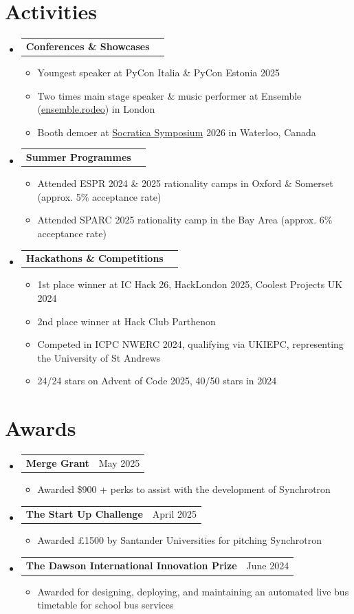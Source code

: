 \documentclass[letterpaper,11pt]{article}
\makeatletter
\newcommand{\resumeItem}[1]{
  \item\small{
    {#1 \vspace{-2pt}}
  }
}
\newcommand{\resumeProjectHeading}[2]{
    \item
    \begin{tabular*}{0.97\textwidth}{l@{\extracolsep{\fill}}r}
      \textbf{#1} & #2 \\
    \end{tabular*}\vspace{-7pt}
}
\newcommand{\resumeSubHeadingListStart}{\begin{itemize}[leftmargin=0.15in, label={}]}
\newcommand{\resumeSubHeadingListEnd}{\end{itemize}}
\newcommand{\resumeItemListStart}{\begin{itemize}}
\newcommand{\resumeItemListEnd}{\end{itemize}\vspace{-5pt}}
\makeatother
\begin{document}
\section{Activities}
    \resumeSubHeadingListStart
      \resumeProjectHeading
        {Conferences \& Showcases}{}
        \resumeItemListStart
          \resumeItem{Youngest speaker at PyCon Italia \& PyCon Estonia 2025}
          \resumeItem{Two times main stage speaker \& music performer at Ensemble (\href{https://ensemble.rodeo}{ensemble.rodeo}) in London}
          \resumeItem{Booth demoer at \href{https://symposium.socratica.info/}{Socratica Symposium} 2026 in Waterloo, Canada}
        \resumeItemListEnd
      \resumeProjectHeading
        {Summer Programmes}{}
        \resumeItemListStart
          \resumeItem{Attended ESPR 2024 \& 2025 rationality camps in Oxford \& Somerset (approx. 5\% acceptance rate)}
          \resumeItem{Attended SPARC 2025 rationality camp in the Bay Area (approx. 6\% acceptance rate)}
        \resumeItemListEnd
      \resumeProjectHeading
        {Hackathons \& Competitions}{}
        \resumeItemListStart
          \resumeItem{1st place winner at IC Hack 26, HackLondon 2025, Coolest Projects UK 2024}
          \resumeItem{2nd place winner at Hack Club Parthenon}
          \resumeItem{Competed in ICPC NWERC 2024, qualifying via UKIEPC, representing the University of St Andrews}
          \resumeItem{24/24 stars on Advent of Code 2025, 40/50 stars in 2024}
        \resumeItemListEnd
    \resumeSubHeadingListEnd

\section{Awards}
    \resumeSubHeadingListStart
      \resumeProjectHeading
        {Merge Grant}{May 2025}
        \resumeItemListStart
          \resumeItem{Awarded \$900 + perks to assist with the development of Synchrotron}
        \resumeItemListEnd
      \resumeProjectHeading
        {The Start Up Challenge}{April 2025}
        \resumeItemListStart
          \resumeItem{Awarded £1500 by Santander Universities for pitching Synchrotron}
        \resumeItemListEnd
      \resumeProjectHeading
        {The Dawson International Innovation Prize}{June 2024}
        \resumeItemListStart
          \resumeItem{Awarded for designing, deploying, and maintaining an automated live bus timetable for school bus services}
        \resumeItemListEnd
    \resumeSubHeadingListEnd
\end{document}
